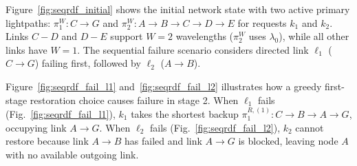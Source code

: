 
\usetikzlibrary{arrows.meta, calc}


Figure~\ref{fig:seqrdf_initial} shows the initial network state with two active primary lightpaths: $\pi_1^W: C \to G$ and $\pi_2^W: A \to B \to C \to D \to E$ for requests $k_1$ and $k_2$. Links $C-D$ and $D-E$ support $W = 2$ wavelengths ($\pi_2^W$ uses $\lambda_0$), while all other links have $W = 1$. The sequential failure scenario considers directed link $\ell_1$ ($C \to G$) failing first, followed by $\ell_2$ ($A \to B$).


Figure~\ref{fig:seqrdf_fail_l1} and~\ref{fig:seqrdf_fail_l2} illustrates how a greedy first-stage restoration choice causes failure in stage 2. When $\ell_1$ fails (Fig.~\ref{fig:seqrdf_fail_l1}), $k_1$ takes the shortest backup $\pi_1^{R,(1)}: C \to B \to A \to G$, occupying link $A \to G$. When $\ell_2$ fails (Fig.~\ref{fig:seqrdf_fail_l2}), $k_2$ cannot restore because link $A \to B$ has failed and link $A \to G$ is blocked, leaving node $A$ with no available outgoing link.

